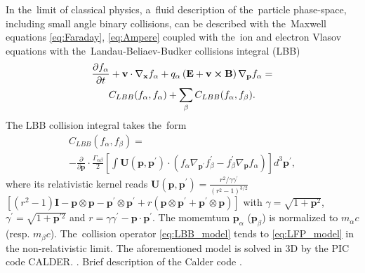 In the~limit of classical physics, a~fluid description of the~particle 
phase-space, including small angle binary collisions, can be described with 
the~Maxwell equations \eqref{eq:Faraday}, \eqref{eq:Ampere}
coupled with the~ion and electron Vlasov equations with 
the~Landau-Beliaev-Budker collisions integral (LBB)
\cite{Landau_1936, Beliaev_SPD1956} 
\begin{multline}
\frac{\partial f_\alpha}{\partial t}+\mathbf{v}\cdot\nabla_{\mathbf{x}}f_\alpha+q_\alpha\left(\mathbf{E}+\mathbf{v}\boldsymbol{\times}\mathbf{B}\right)\nabla_{\mathbf{p}}f_\alpha =
\\
C_{LBB}(f_\alpha,f_\alpha)+\sum_\beta C_{LBB}(f_\alpha,f_\beta)
.
\end{multline}
The LBB collision integral takes the~form
\begin{multline}
C_{LBB}(f_\alpha,f_\beta)=
\\
-\frac{\partial}{\partial \mathbf{p}}\cdot\frac{\Gamma_{\alpha\beta}}{2}\left[\int \mathbf{U}(\mathbf{p},\mathbf{p}^\prime)\cdot(f_\alpha\nabla_{\mathbf{p}^\prime}f_\beta^\prime-f_\beta^\prime\nabla_{\mathbf{p}}f_\alpha)\right]d^3\mathbf{p}^\prime
,
\label{eq:LBB_model}
\end{multline}
where its relativistic kernel reads
$\mathbf{U}(\mathbf{p},\mathbf{p}^\prime)=\frac{r^2/\gamma\gamma^\prime}{(r^2-1)^{3/2}}$ 
$\left[(r^2-1)\mathbf{I}-\mathbf{p}\otimes\mathbf{p}-\mathbf{p}^\prime\otimes\mathbf{p}^\prime+r(\mathbf{p}\otimes\mathbf{p}^\prime+\mathbf{p}^\prime\otimes\mathbf{p})\right]$
with $\gamma=\sqrt{1+\mathbf{p}^2}$, $\gamma^\prime=\sqrt{1+\mathbf{p}^{\prime 2}}$ and $r=\gamma\gamma^\prime-\mathbf{p}\cdot\mathbf{p}^\prime$. 
The momemtum $\mathbf{p}_\alpha$ ($\mathbf{p}_\beta$) is normalized to 
$m_\alpha c$ (resp. $m_\beta c$). The~collision operator \eqref{eq:LBB_model} 
tends to \eqref{eq:LFP_model} in the non-relativistic limit.
The aforementioned model is solved in 3D by the PIC code CALDER. 
\cite{Lefebvre_NF2003, Perez_PoP2012}.
Brief description of the Calder code .

